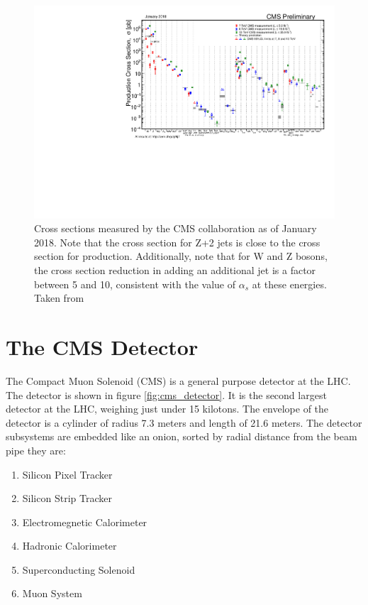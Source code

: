     \begin{figure}[h!]
      \centering
      \includegraphics[width=.7\textwidth]{figures/cms_cross_sections.pdf}
      \caption[Cross sections measured by the CMS collaboration as of January 2018. Note that the cross section for Z+2 jets is close to the cross section for \ttbar production.]{Cross sections measured by the CMS collaboration as of January 2018. Note that the cross section for Z+2 jets is close to the cross section for \ttbar production. Additionally, note that for W and Z bosons, the cross section reduction in adding an additional jet is a factor between 5 and 10, consistent with the value of $\alpha_s$ at these energies. Taken from \cite{cms_results}}
      \label{fig:cms_cross_sections}
    \end{figure}

\section{The CMS Detector}
  
  The Compact Muon Solenoid (CMS) is a general purpose detector at the LHC. The detector is shown in figure \ref{fig:cms_detector}. It is the second largest detector at the LHC, weighing just under 15 kilotons. The envelope of the detector is a cylinder of radius 7.3 meters and length of 21.6 meters. The detector subsystems are embedded like an onion, sorted by radial distance from the beam pipe they are:

  \begin{enumerate}
    \item{Silicon Pixel Tracker}
    \item{Silicon Strip Tracker}
    \item{Electromegnetic Calorimeter}
    \item{Hadronic Calorimeter}
    \item{Superconducting Solenoid}
    \item{Muon System}
  \end{enumerate}

